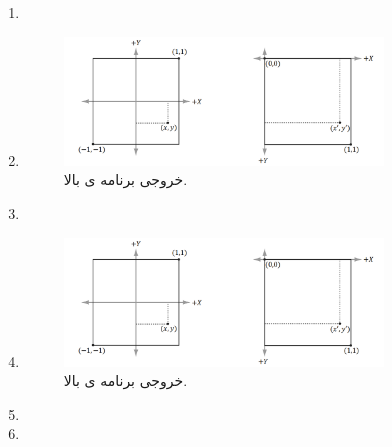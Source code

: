 {\begin{spacing}{1.5}
\begin{enumerate}[label=\textbf{\arabic*}.]
            \item {}

            \item {
                \begin{center}
                \end{center}
                \begin{figure}[H]
                    \centering
                    \setlength{\belowcaptionskip}{-10pt}
                    \includegraphics[width=0.8\textwidth]{Images/4/3/4.Session.1.3.16}
                    \caption {خروجی برنامه ی بالا.}
                    \label{fig:4.Session.1.3.16}
                \end{figure}
            }

            \item {}

            \item {
                \begin{center}
                \end{center}
                \begin{figure}[H]
                    \centering
                    \setlength{\belowcaptionskip}{-10pt}
                    \includegraphics[width=0.8\textwidth]{Images/4/3/4.Session.1.3.16}
                    \caption {خروجی برنامه ی بالا.}
                    \label{fig:4.Session.1.3.16}
                \end{figure}
            }

            \item {}

            \item {}


\end{enumerate}
\end{spacing}}

